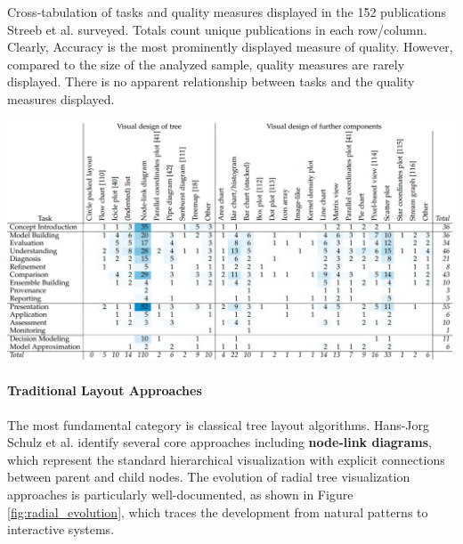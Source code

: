 \begin{table}
    \centering
    \caption{Cross-tabulation of tasks and quality measures displayed in the 152 publications Streeb et al. \cite{Streeb2021TaskBasedVI} surveyed. Totals count unique publications in each row/column. Clearly, Accuracy is the most prominently displayed measure of quality. However, compared to the size of the analyzed sample, quality measures are rarely displayed. There is no apparent relationship between tasks and the quality measures displayed.}
    \label{tab:VisualDesignsOfTreesANDFurtherComponentsStreeb2021TaskBasedVI}
    \includegraphics[width=\linewidth]{images/VisualDesignsOfTreesANDFurtherComponentsStreeb2021TaskBasedVI.png}
\end{table}

\paragraph{Traditional Layout Approaches}

The most fundamental category is classical tree layout algorithms. Hans-Jorg Schulz et al. \cite{schulz2011treevis} identify several core approaches including \textbf{node-link diagrams}, which represent the standard hierarchical visualization with explicit connections between parent and child nodes. The evolution of radial tree visualization approaches is particularly well-documented, as shown in Figure \ref{fig:radial_evolution}, which traces the development from natural patterns to interactive systems.

